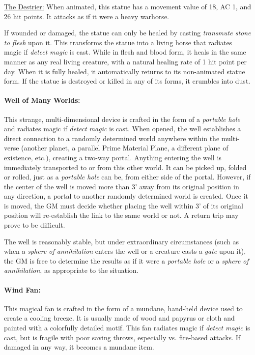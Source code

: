 \begin{multicols}{2}
\underline{The Destrier:} When animated, this statue has a movement value of 18, AC 1, and 26 hit points.  It attacks as if it were a heavy warhorse.
 
If wounded or damaged, the statue can only be healed by casting \textit{transmute stone to flesh} upon it.  This transforms the statue into a living horse that radiates magic if \textit{detect magic} is cast.  While in flesh and blood form, it heals in the same manner as any real living creature, with a natural healing rate of 1 hit point per day.  When it is fully healed, it automatically returns to its non-animated statue form.  If the statue is destroyed or killed in any of its forms, it crumbles into dust.

\paragraph{Well of Many Worlds:} This strange, multi-dimensional device is crafted in the form of a \textit{portable hole} and radiates magic if \textit{detect magic} is cast.  When opened, the well establishes a direct connection to a randomly determined world anywhere within the multi-verse (another planet, a parallel Prime Material Plane, a different plane of existence, etc.), creating a two-way portal.  Anything entering the well is immediately transported to or from this other world.  It can be picked up, folded or rolled, just as a \textit{portable hole} can be, from either side of the portal.  However, if the center of the well is moved more than 3' away from its original position in any direction, a portal to another randomly determined world is created.  Once it is moved, the GM must decide whether placing the well within 3' of its original position will re-establish the link to the same world or not.  A return trip may prove to be difficult.

The well is reasonably stable, but under extraordinary circumstances (such as when a \textit{sphere of annihilation} enters the well or a creature casts a \textit{gate} upon it), the GM is free to determine the results as if it were a \textit{portable hole} or a \textit{sphere of annihilation}, as appropriate to the situation.

\paragraph{Wind Fan:} This magical fan is crafted in the form of a mundane, hand-held device used to create a cooling breeze.  It is usually made of wood and papyrus or cloth and painted with a colorfully detailed motif.  This fan radiates magic if \textit{detect magic} is cast, but is fragile with poor saving throws, especially vs. fire-based attacks.  If damaged in any way, it becomes a mundane item. 


\end{multicols}
